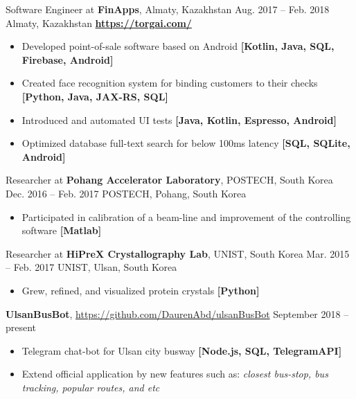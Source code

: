 \documentclass[10pt,a4paper]{altacv}
\begin{document}
\medskip

\cveventflat
    {Software Engineer at }
    {\textbf{FinApps}, Almaty, Kazakhstan}
    {Aug. 2017 -- Feb. 2018}
    {Almaty, Kazakhstan}
\smallskip
\newline
\href{https://torgai.com/}{\textbf{https://torgai.com/}}
\begin{itemize}
\item Developed point-of-sale software based on Android
    \textbf{[Kotlin, Java, SQL, Firebase, Android]}
\item Created face recognition system for binding customers to their checks 
    \textbf{[Python, Java, JAX-RS, SQL]}
\item Introduced and automated UI tests 
    \textbf{[Java, Kotlin, Espresso, Android]}
\item Optimized database full-text search for below 100ms latency 
    \textbf{[SQL, SQLite, Android]}
\end{itemize}

\medskip

\cveventflat
    {Researcher at}
    {\textbf{Pohang Accelerator Laboratory}, POSTECH, South Korea}
    {Dec. 2016 -- Feb. 2017}
    {POSTECH, Pohang, South Korea}
\medskip
\begin{itemize}
\item Participated in calibration of a beam-line and improvement of the controlling software 
    \textbf{[Matlab]}
\end{itemize}
\medskip
\cveventflat
    {Researcher at}
    {\textbf{HiPreX Crystallography Lab}, UNIST, South Korea}
    {Mar. 2015 --  Feb. 2017}
    {UNIST, Ulsan, South Korea}
\medskip
\begin{itemize}
\item Grew, refined, and visualized protein crystals
    \textbf{[Python]}
\end{itemize}


\cveventflat
    {\textbf{UlsanBusBot}, }
    {{\url{https://github.com/DaurenAbd/ulsanBusBot}}}
    {September 2018 -- present}{}
\medskip
\begin{itemize}
\item Telegram chat-bot for Ulsan city busway
    \textbf{[Node.js, SQL, TelegramAPI]}
\item Extend official application by new features such as:
    \textit{closest bus-stop, bus tracking, popular routes, and etc}
\end{itemize}
\medskip
\end{document}
